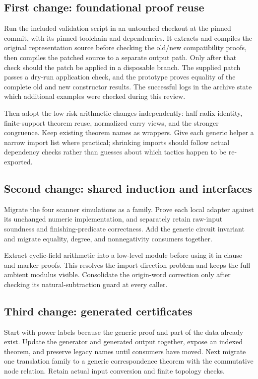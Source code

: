 \documentclass[11pt,letterpaper]{article}
\begin{document}
\subsection{First change: foundational proof reuse}

Run the included validation script in an untouched checkout at the pinned commit, with its pinned toolchain and dependencies. It extracts and compiles the original representation source before checking the old/new compatibility proofs, then compiles the patched source to a separate output path. Only after that check should the patch be applied in a disposable branch. The supplied patch passes a dry-run application check, and the prototype proves equality of the complete old and new constructor results. The successful logs in the archive state which additional examples were checked during this review.

Then adopt the low-risk arithmetic changes independently: half-radix identity, finite-support theorem reuse, normalized carry views, and the stronger congruence. Keep existing theorem names as wrappers. Give each generic helper a narrow import list where practical; shrinking imports should follow actual dependency checks rather than guesses about which tactics happen to be re-exported.

\subsection{Second change: shared induction and interfaces}

Migrate the four scanner simulations as a family. Prove each local adapter against its unchanged numeric implementation, and separately retain raw-input soundness and finishing-predicate correctness. Add the generic circuit invariant and migrate equality, degree, and nonnegativity consumers together.

Extract cyclic-field arithmetic into a low-level module before using it in clause and marker proofs. This resolves the import-direction problem and keeps the full ambient modulus visible. Consolidate the origin-word correction only after checking its natural-subtraction guard at every caller.

\subsection{Third change: generated certificates}

Start with power labels because the generic proof and part of the data already exist. Update the generator and generated output together, expose an indexed theorem, and preserve legacy names until consumers have moved. Next migrate one translation family to a generic correspondence theorem with the commutative node relation. Retain actual input conversion and finite topology checks.
\end{document}
